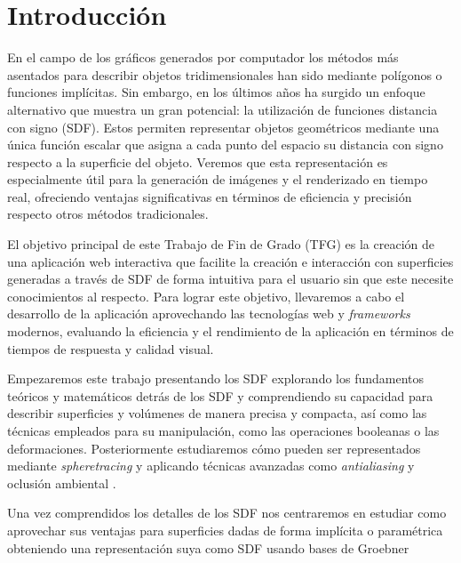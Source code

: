 %


\chapter{Introducción}
En el campo de los gráficos generados por computador los métodos más asentados para describir objetos tridimensionales han sido mediante polígonos o funciones implícitas. Sin embargo, en los últimos años ha surgido un enfoque alternativo que muestra un gran potencial: la utilización de funciones distancia con signo (SDF). Estos permiten representar objetos geométricos mediante una única función escalar que asigna a cada punto del espacio su distancia con signo respecto a la superficie del objeto. Veremos que esta representación es especialmente útil para la generación de imágenes y el renderizado en tiempo real, ofreciendo ventajas significativas en términos de eficiencia y precisión respecto otros métodos tradicionales.\newline


El objetivo principal de este Trabajo de Fin de Grado (TFG) es la creación de una aplicación web interactiva que facilite la creación e interacción con superficies generadas a través de SDF de forma intuitiva para el usuario sin que este necesite conocimientos al respecto. Para lograr este objetivo, llevaremos a cabo el desarrollo de la aplicación aprovechando las tecnologías web y \textit{frameworks} modernos, evaluando la eficiencia y el rendimiento de la aplicación en términos de tiempos de respuesta y calidad visual.\newline


Empezaremos este trabajo presentando los SDF explorando los fundamentos teóricos y matemáticos detrás de los SDF y comprendiendo su capacidad para describir superficies y volúmenes de manera precisa y compacta, así como las técnicas empleados para su manipulación, como las operaciones booleanas o las deformaciones. Posteriormente estudiaremos cómo pueden ser representados mediante \textit{spheretracing} y aplicando técnicas avanzadas como \textit{antialiasing} y oclusión ambiental .\newline

Una vez comprendidos los detalles de los SDF nos centraremos en estudiar como aprovechar sus ventajas para superficies dadas de forma implícita o paramétrica obteniendo una representación suya como SDF usando bases de Groebner

\endinput
